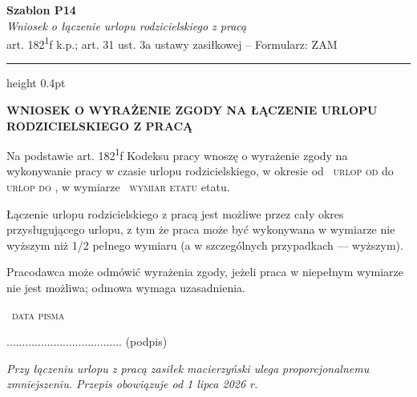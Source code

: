 \documentclass[11pt,a4paper]{article}
\newcommand{\Pole}[1]{%
  \textcolor{szary}{\dotfill}\,%
  {\scriptsize\textcolor{szary}{\textsc{#1}}}%
}
\newcommand{\NaglowekPisma}[1]{%
  \par\vspace{0.8em}%
  \begin{center}%
    {\large\bfseries\MakeUppercase{#1}}%
  \end{center}%
  \vspace{0.4em}%
}
\begin{document}
\begin{flushright}
{\footnotesize\color{szary}
\textbf{Szablon P14}\\
{\itshape Wniosek o łączenie urlopu rodzicielskiego z pracą}\\
art. 182\textsuperscript{1}f k.p.; art. 31 ust. 3a ustawy zasiłkowej -- Formularz: ZAM}\
\end{flushright}

\vspace{0.5em}
{\color{ramka}\hrule height 0.4pt}
\vspace{0.8em}

\NaglowekPisma{WNIOSEK O WYRAŻENIE ZGODY NA ŁĄCZENIE URLOPU RODZICIELSKIEGO Z PRACĄ}

Na podstawie art. 182\textsuperscript{1}f Kodeksu pracy wnoszę o wyrażenie zgody na wykonywanie
pracy w czasie urlopu rodzicielskiego, w okresie od \Pole{urlop od} do \Pole{urlop do},
w wymiarze \Pole{wymiar etatu} etatu.

Łączenie urlopu rodzicielskiego z pracą jest możliwe przez cały okres
przysługującego urlopu, z tym że praca może być wykonywana w wymiarze
nie wyższym niż 1/2 pełnego wymiaru (a w szczególnych przypadkach --- wyższym).

Pracodawca może odmówić wyrażenia zgody, jeżeli praca w niepełnym wymiarze
nie jest możliwa; odmowa wymaga uzasadnienia.

\Pole{data pisma}
.....................................
(podpis)

\vfill
{\footnotesize\textcolor{szary}\itshape Przy łączeniu urlopu z pracą zasiłek macierzyński ulega proporcjonalnemu zmniejszeniu. Przepis obowiązuje od 1 lipca 2026 r. }
\end{document}
